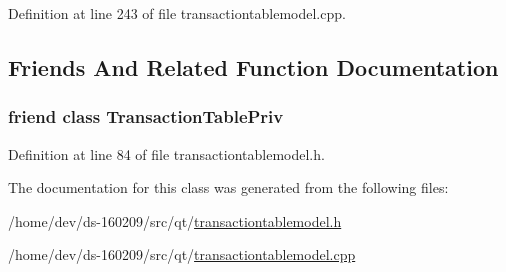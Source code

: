 Definition at line 243 of file transactiontablemodel.\+cpp.



\subsection{Friends And Related Function Documentation}
\hypertarget{class_transaction_table_model_a39d3ddddb3af12905ad5538a91753736}{}
\subsubsection[{Transaction\+Table\+Priv}]{\setlength{\rightskip}{0pt plus 5cm}friend class {\bf Transaction\+Table\+Priv}\hspace{0.3cm}{\ttfamily [friend]}}\label{class_transaction_table_model_a39d3ddddb3af12905ad5538a91753736}


Definition at line 84 of file transactiontablemodel.\+h.



The documentation for this class was generated from the following files\+:\begin{DoxyCompactItemize}
\item 
/home/dev/ds-\/160209/src/qt/\hyperlink{transactiontablemodel_8h}{transactiontablemodel.\+h}\item 
/home/dev/ds-\/160209/src/qt/\hyperlink{transactiontablemodel_8cpp}{transactiontablemodel.\+cpp}\end{DoxyCompactItemize}
